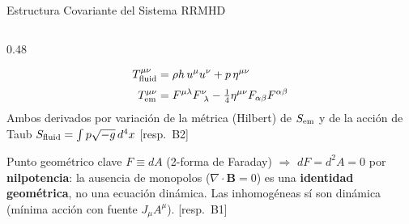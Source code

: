 \documentclass[aspectratio=169,9pt]{beamer}
\begin{document}
\begin{frame}{Estructura Covariante del Sistema RRMHD}
\begin{columns}[T]
\begin{column}{0.48\textwidth}
\begin{tcolorbox}[EQ={Tensor de energ\'ia-momento total}]
\begin{align*}
      T^{\mu\nu}_{\rm fluid} &= \rho h\,u^\mu u^\nu + p\,\eta^{\mu\nu}\\[2pt]
      T^{\mu\nu}_{\rm em} &= F^{\mu\lambda}F^{\nu}_{\ \lambda}
        -\tfrac14\eta^{\mu\nu}F_{\alpha\beta}F^{\alpha\beta}
    \end{align*}
    Ambos derivados por variaci\'on de la m\'etrica (Hilbert)
    de $S_{\rm em}$ y de la acci\'on de Taub $S_{\rm fluid}=\int p\sqrt{-g}\,d^4x$
    \hfill{\tiny[resp.\ B2]}
  \end{tcolorbox}
  \pause\vspace{0.1cm}
  \begin{block}{Punto geom\'etrico clave}
    \scriptsize
    $F\equiv dA$ (2-forma de Faraday) $\Rightarrow$ $dF=d^2A=0$
    por \textbf{nilpotencia}: la ausencia de monopolos
    ($\nabla\!\cdot\!\mathbf B=0$) es una \textbf{identidad geom\'etrica},
    no una ecuaci\'on din\'amica. Las inhomog\'eneas s\'i son din\'amica
    (m\'inima acci\'on con fuente $J_\mu A^\mu$). \hfill{\tiny[resp.\ B1]}
  \end{block}
\end{column}
\end{columns}
\end{frame}
\end{document}
